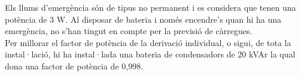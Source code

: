 \newline Els llums d'emergència són de tipus no permanent i es considera que tenen una potència de 3 W. Al disposar de bateria i només encendre's quan hi ha una emergència, no s'han tingut en compte per la previsió de càrregues.\\
\newline Per millorar el factor de potència de la derivació individual, o sigui, de tota la instal·lació, hi ha instal·lada una bateria de condensadors de 20 kVAr la qual dona una factor de potència de 0,998.

